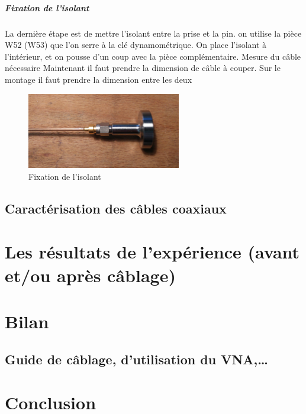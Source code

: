 \documentclass[a4paper,11pt]{report}
\begin{document}
\paragraph*{Fixation de l’isolant}  La dernière étape est de mettre l’isolant entre la prise et la pin. on
utilise la pièce W52 (W53) que l’on serre à la clé dynamométrique. On place l’isolant à
l’intérieur, et on pousse d’un coup avec la pièce complémentaire.
Mesure du câble nécessaire Maintenant il faut prendre la dimension de câble à couper.
Sur le montage il faut prendre la dimension entre les deux{}
\begin{figure}[h]
    \begin{center}
        \includegraphics[width=0.60\textwidth]{Images/Coax/6}
        \caption{Fixation de l’isolant}
        \label{fig:}
    \end{center}
\end{figure}

\section{Caractérisation des câbles coaxiaux}


\chapter{Les résultats de l'expérience (avant et/ou après câblage)}

\chapter{Bilan}
\section{Guide de câblage, d'utilisation du VNA,…}
\chapter*{Conclusion}
%



\end{document}
